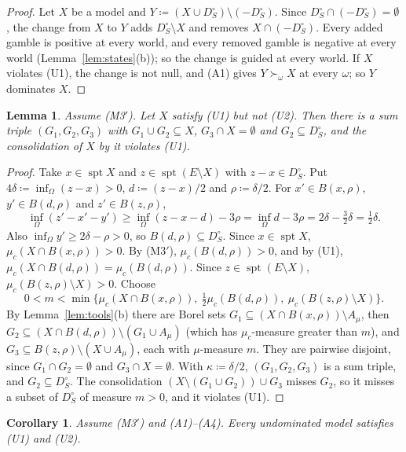 \documentclass[11pt]{article}
\DeclareMathOperator{\spt}{spt}
\theoremstyle{plain}
\newtheorem{lemma}[theorem]{Lemma}
\newtheorem{corollary}[theorem]{Corollary}
\theoremstyle{definition}
\begin{document}
\begin{proof}
Let $X$ be a model and $Y\coloneqq(X\cup D_S^\circ)\setminus(-D_S^\circ)$. Since $D_S^\circ\cap
(-D_S^\circ)=\emptyset$, the change from $X$ to $Y$ adds $D_S^\circ\setminus X$ and removes
$X\cap(-D_S^\circ)$. Every added gamble
is positive at every world, and every removed gamble is negative at every world
(Lemma~\ref{lem:states}(b)); so the change is guided at every world. If $X$ violates (U1), the
change is not null, and (A1) gives $Y\succ_\omega X$ at every $\omega$; so $Y$ dominates $X$.
\end{proof}

\begin{lemma}\label{lem:U2}
Assume (M3$'$). Let $X$ satisfy (U1) but not (U2). Then there is a sum triple $(G_1,G_2,G_3)$
with $G_1\cup G_2\subseteq X$, $G_3\cap X=\emptyset$ and $G_2\subseteq D_S^\circ$, and the
consolidation of $X$ by it violates (U1).
\end{lemma}

\begin{proof}
Take $x\in\spt X$ and $z\in\spt(E\setminus X)$ with $z-x\in D_S^\circ$. Put $4\delta\coloneqq
\inf_\Omega(z-x)>0$, $d\coloneqq(z-x)/2$ and $\rho\coloneqq\delta/2$. For $x'\in B(x,\rho)$,
$y'\in B(d,\rho)$ and $z'\in B(z,\rho)$,
\[
  \inf_\Omega(z'-x'-y')\ge\inf_\Omega(z-x-d)-3\rho=\inf_\Omega d-3\rho=2\delta-\tfrac32\delta=
  \tfrac12\delta .
\]
Also $\inf_\Omega y'\ge2\delta-\rho>0$, so $B(d,\rho)\subseteq D_S^\circ$. Since $x\in\spt X$,
$\mu_c(X\cap B(x,\rho))>0$. By (M3$'$), $\mu_c(B(d,\rho))>0$, and by (U1),
$\mu_c(X\cap B(d,\rho))=\mu_c(B(d,\rho))$. Since $z\in\spt(E\setminus X)$,
$\mu_c(B(z,\rho)\setminus X)>0$. Choose
\[
  0<m<\min\bigl\{\mu_c(X\cap B(x,\rho)),\ \tfrac12\mu_c(B(d,\rho)),\ \mu_c(B(z,\rho)\setminus
  X)\bigr\}.
\]
By Lemma~\ref{lem:tools}(b) there are Borel sets $G_1\subseteq(X\cap B(x,\rho))\setminus
A_\mu$, then $G_2\subseteq(X\cap B(d,\rho))\setminus(G_1\cup A_\mu)$ (which has
$\mu_c$-measure greater than $m$), and $G_3\subseteq B(z,\rho)\setminus(X\cup A_\mu)$, each
with $\mu$-measure $m$. They are pairwise disjoint, since $G_1\cap G_2=\emptyset$ and $G_3\cap
X=\emptyset$. With $\kappa\coloneqq\delta/2$, $(G_1,G_2,G_3)$ is a sum triple, and $G_2\subseteq
D_S^\circ$. The consolidation $(X\setminus(G_1\cup G_2))\cup G_3$ misses $G_2$, so it misses a subset
of $D_S^\circ$ of measure $m>0$, and it violates (U1).
\end{proof}

\begin{corollary}\label{cor:U}
Assume (M3$'$) and (A1)--(A4). Every undominated model satisfies (U1) and (U2).
\end{corollary}
\end{document}
